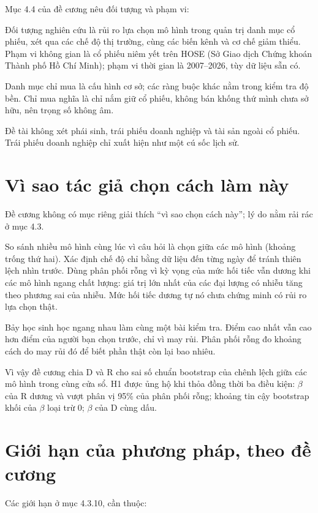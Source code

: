 Mục 4.4 của đề cương nêu đối tượng và phạm vi:

Đối tượng nghiên cứu là rủi ro lựa chọn mô hình trong quản trị danh mục cổ phiếu, xét qua các chế độ thị trường, cùng các biến kênh và cơ chế giảm thiểu. Phạm vi không gian là cổ phiếu niêm yết trên HOSE (Sở Giao dịch Chứng khoán Thành phố Hồ Chí Minh); phạm vi thời gian là 2007--2026, tùy dữ liệu sẵn có.

Danh mục chỉ mua là cấu hình cơ sở; các ràng buộc khác nằm trong kiểm tra độ bền. Chỉ mua nghĩa là chỉ nắm giữ cổ phiếu, không bán khống thứ mình chưa sở hữu, nên trọng số không âm.

Đề tài không xét phái sinh, trái phiếu doanh nghiệp và tài sản ngoài cổ phiếu. Trái phiếu doanh nghiệp chỉ xuất hiện như một cú sốc lịch sử.

\section{Vì sao tác giả chọn cách làm này}

Đề cương không có mục riêng giải thích “vì sao chọn cách này”; lý do nằm rải rác ở mục 4.3.

So sánh nhiều mô hình cùng lúc vì câu hỏi là chọn giữa các mô hình (khoảng trống thứ hai). Xác định chế độ chỉ bằng dữ liệu đến từng ngày để tránh thiên lệch nhìn trước. Dùng phân phối rỗng vì kỳ vọng của mức hối tiếc vẫn dương khi các mô hình ngang chất lượng: giá trị lớn nhất của các đại lượng có nhiễu tăng theo phương sai của nhiễu. Mức hối tiếc dương tự nó chưa chứng minh có rủi ro lựa chọn thật.

Bảy học sinh học ngang nhau làm cùng một bài kiểm tra. Điểm cao nhất vẫn cao hơn điểm của người bạn chọn trước, chỉ vì may rủi. Phân phối rỗng đo khoảng cách do may rủi đó để biết phần thật còn lại bao nhiêu.

Vì vậy đề cương chia D và R cho sai số chuẩn bootstrap của chênh lệch giữa các mô hình trong cùng cửa sổ. H1 được ủng hộ khi thỏa đồng thời ba điều kiện: \texorpdfstring{$\beta$}{beta} của R dương và vượt phân vị 95\% của phân phối rỗng; khoảng tin cậy bootstrap khối của \texorpdfstring{$\beta$}{beta} loại trừ 0; \texorpdfstring{$\beta$}{beta} của D cùng dấu.

\section{Giới hạn của phương pháp, theo đề cương}

Các giới hạn ở mục 4.3.10, cần thuộc:

